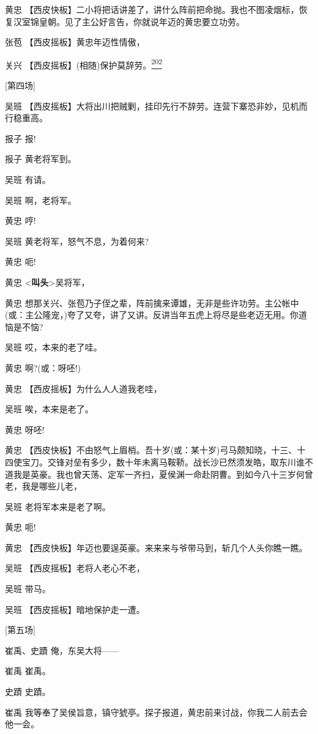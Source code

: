 黄忠
【西皮快板】二小将把话讲差了，讲什么阵前把命抛。我也不图凌烟标，恢复汉室锦皇朝。见了主公好言告，你就说年迈的黄忠要立功劳。

张苞 【西皮摇板】黄忠年迈性情傲，

关兴
【西皮摇板】(相随)保护莫辞劳。\protect\hyperlink{fn202}{\textsuperscript{202}}

{[}第四场{]}

吴班
【西皮摇板】大将出川把贼剿，挂印先行不辞劳。连营下寨恐非妙，见机而行稳重高。

报子 报!

报子 黄老将军到。

吴班 有请。

吴班 啊，老将军。

黄忠 哼!

吴班 黄老将军，怒气不息，为着何来?

黄忠 呃!

黄忠 \textless{}\textbf{叫头}\textgreater{}吴将军，

黄忠
想那关兴、张苞乃子侄之辈，阵前擒来谭雄，无非是些许功劳。主公帐中(或：主公隆宠，)夸了又夸，讲了又讲。反讲当年五虎上将尽是些老迈无用。你道恼是不恼?

吴班 哎，本来的老了哇。

黄忠 啊?(或：呀呸!)

黄忠 【西皮摇板】为什么人人道我老哇，

吴班 唉，本来是老了。

黄忠 呀呸!

黄忠
【西皮快板】不由怒气上眉梢。吾十岁(或：某十岁)弓马颇知晓，十三、十四使宝刀。交锋对垒有多少，数十年未离马鞍鞒。战长沙已然须发皓，取东川谁不道我是英豪。我也曾天荡、定军一齐扫，夏侯渊一命赴阴曹。到如今八十三岁何曾老，我是哪些儿老，

吴班 老将军本来是老了啊。

黄忠 呃!

黄忠 【西皮快板】年迈也要逞英豪。来来来与爷带马到，斩几个人头你瞧一瞧。

吴班 【西皮摇板】老将人老心不老，

吴班 带马。

吴班 【西皮摇板】暗地保护走一遭。

{[}第五场{]}

崔禹、史蹟 俺，东吴大将------

崔禹 崔禹。

史蹟 史蹟。

崔禹
我等奉了吴侯旨意，镇守猇亭。探子报道，黄忠前来讨战，你我二人前去会他一会。

